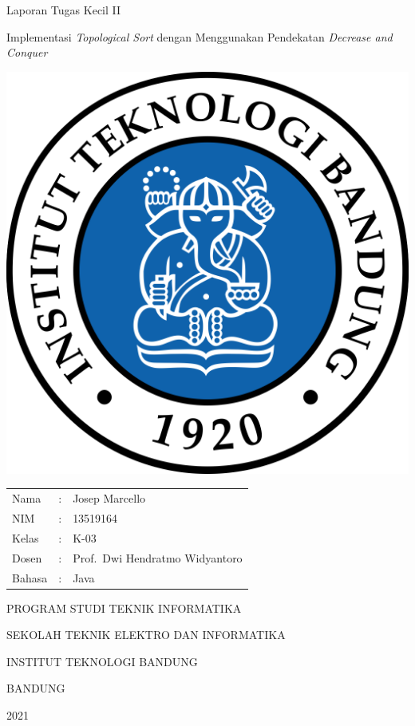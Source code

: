 \documentclass{article}
\begin{document}
\begin{titlepage}
  \centering
  \Large Laporan Tugas Kecil II

  \large Implementasi \textit{Topological Sort} dengan Menggunakan Pendekatan \textit{Decrease and Conquer}

  \normalsize


  \includegraphics[scale=0.2]{logo-itb.png}

  \begin{tabular}{lll}
    Nama  &: & Josep Marcello \\
    NIM &: & 13519164 \\
    Kelas &: & K-03 \\
    Dosen &: & Prof.\ Dwi Hendratmo Widyantoro \\
    Bahasa &: & Java \\
  \end{tabular}

  \large
  PROGRAM STUDI TEKNIK INFORMATIKA

  SEKOLAH TEKNIK ELEKTRO DAN INFORMATIKA

  INSTITUT TEKNOLOGI BANDUNG

  BANDUNG

  2021

\end{titlepage}
\end{document}
